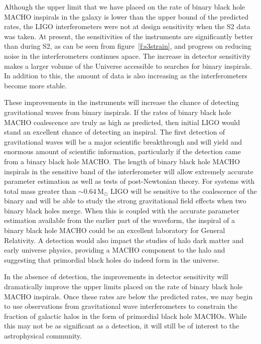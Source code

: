
Although the upper limit that we have placed on the rate of binary black hole
MACHO inspirals in the galaxy is lower than the upper bound of the predicted
rates, the LIGO interferometers were not at design sensitivity when the S2
data was taken. At present, the sensitivities of the instruments are
significantly better than during S2, as can be seen from
figure~\ref{f:s3strain}, and progress on reducing noise in the interferometers
continues apace.  The increase in detector sensitivity makes a larger volume
of the Universe accessible to searches for binary inspirals. In addition to
this, the amount of data is also increasing as the interferometers become more
stable.

These improvements in the instruments will increase the chance of detecting
gravitational waves from binary inspirals. If the rates of binary black hole
MACHO coalescence are truly as high as predicted, then initial LIGO would
stand an excellent chance of detecting an inspiral. The first detection of
gravitational waves will be a major scientific breakthrough and will yield and
enormous amount of scientific information, particularly if the detection came
from a binary black hole MACHO. The length of binary black hole MACHO
inspirals in the sensitive band of the interferometer will allow extremely
accurate parameter estimation as well as tests of post-Newtonian theory. For
systems with total mass greater than $\sim 0.64\,\mathrm{M}_\odot$ LIGO will
be sensitive to the coalescence of the binary and will be able to study the
strong gravitational field effects when two binary black holes merge. When
this is coupled with the accurate parameter estimation available from the
earlier part of the waveform, the inspiral of a binary black hole MACHO could
be an excellent laboratory for General Relativity.  A detection would also
impact the studies of halo dark matter and early universe physics, providing a
MACHO component to the halo and suggesting that primordial black holes do
indeed form in the universe.

In the absence of detection, the improvements in detector sensitivity will
dramatically improve the upper limits placed on the rate of binary black hole
MACHO inspirals. Once these rates are below the predicted rates, we may begin
to use observations from gravitational wave interferometers to constrain the
fraction of galactic halos in the form of primordial black hole MACHOs. While
this may not be as significant as a detection, it will still be of interest to
the astrophysical community.

